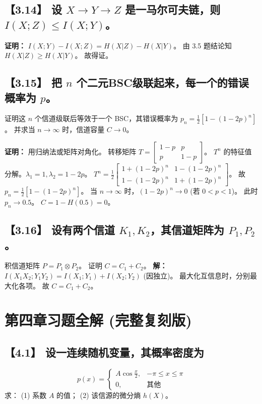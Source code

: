 \documentclass[11pt, a4paper]{article}
\begin{document}
\subsection*{【3.14】 设 $X \to Y \to Z$ 是一马尔可夫链，则 $I(X;Z) \le I(X;Y)$。}
\textbf{证明：}
$I(X;Y) - I(X;Z) = H(X|Z) - H(X|Y)$。
由 3.5 题结论知 $H(X|Z) \ge H(X|Y)$。
故得证。

\subsection*{【3.15】 把 $n$ 个二元BSC级联起来，每一个的错误概率为 $p$。}
证明这 $n$ 个信道级联后等效于一个 BSC，其错误概率为 $p_n = \frac{1}{2}[1 - (1-2p)^n]$。
并求当 $n \to \infty$ 时，信道容量 $C \to 0$。

\textbf{证明：}
用归纳法或矩阵对角化。
转移矩阵 $T = \begin{bmatrix} 1-p & p \\ p & 1-p \end{bmatrix}$。
$T^n$ 的特征值分解。$\lambda_1=1, \lambda_2=1-2p$。
$T^n = \frac{1}{2} \begin{bmatrix} 1+(1-2p)^n & 1-(1-2p)^n \\ 1-(1-2p)^n & 1+(1-2p)^n \end{bmatrix}$。
故 $p_n = \frac{1}{2}[1 - (1-2p)^n]$。
当 $n \to \infty$ 时，$(1-2p)^n \to 0$ (若 $0<p<1$)。
此时 $p_n \to 0.5$。
$C = 1 - H(0.5) = 0$。

\subsection*{【3.16】 设有两个信道 $K_1, K_2$，其信道矩阵为 $P_1, P_2$。}
积信道矩阵 $P = P_1 \otimes P_2$。
证明 $C = C_1 + C_2$。
\textbf{解：}
$I(X_1 X_2; Y_1 Y_2) = I(X_1; Y_1) + I(X_2; Y_2)$ (因独立)。
最大化互信息时，分别最大化各项。
故 $C = C_1 + C_2$。

\section{第四章习题全解 (完整复刻版)}

\subsection*{【4.1】 设一连续随机变量，其概率密度为}
\[ p(x) = \begin{cases} A \cos \frac{x}{2}, & -\pi \le x \le \pi \\ 0, & \text{其他} \end{cases} \]
求：
(1) 系数 $A$ 的值；
(2) 该信源的微分熵 $h(X)$。
\end{document}
